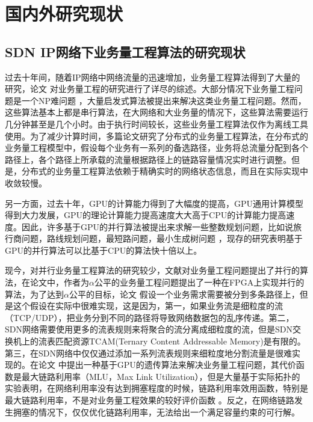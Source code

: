 \documentclass[master]{thesis-uestc}
\begin{document}
\section{国内外研究现状}
\subsection{SDN IP网络下业务量工程算法的研究现状}
过去十年间，随着IP网络中网络流量的迅速增加，业务量工程算法得到了大量的研究，论文 对业务量工程的研究进行了详尽的综述。大部分情况下业务量工程问题是一个NP难问题 ，大量启发式算法被提出来解决这类业务量工程问题。然而，这些算法基本上都是串行算法，在大网络和大业务量的情况下，这些算法需要运行几分钟甚至是几个小时。由于执行时间较长，这些业务量工程算法仅作为离线工具使用。为了减少计算时间，多篇论文研究了分布式的业务量工程算法，在分布式的业务量工程模型中，假设每个业务有一系列的备选路径，业务将总流量分配到各个路径上，各个路径上所承载的流量根据路径上的链路容量情况实时进行调整。但是，分布式的业务量工程算法依赖于精确实时的网络状态信息，而且在实际实现中收敛较慢。

另一方面，过去十年，GPU的计算能力得到了大幅度的提高，GPU通用计算模型得到大力发展，GPU的理论计算能力提高速度大大高于CPU的计算能力提高速度。因此，许多基于GPU的并行算法被提出来求解一些整数规划问题，比如说旅行商问题，路线规划问题，最短路问题，最小生成树问题 ，现存的研究表明基于GPU的并行算法可以比基于CPU的算法快十倍以上。

现今，对并行业务量工程算法的研究较少，文献对业务量工程问题提出了并行的算法，在论文中，作者为$\alpha$公平的业务量工程问题提出了一种在FPGA上实现并行的算法，为了达到$\alpha$公平的目标，论文 假设一个业务需求需要被分到多条路径上，但是这个假设在实际中很难实现，这是因为，第一，如果业务流是细粒度的流（TCP/UDP），把业务分到不同的路径将导致网络数据包的乱序传递。第二，SDN网络需要使用更多的流表规则来将聚合的流分离成细粒度的流，但是SDN交换机上的流表匹配资源TCAM(Ternary Content Addressable Memory)是有限的。第三，在SDN网络中仅仅通过添加一系列流表规则来细粒度地分割流量是很难实现的。在论文 中提出一种基于GPU的遗传算法来解决业务量工程问题，其代价函数是最大链路利用率（MLU，Max Link Utilization），但是大量基于实际拓扑的实验表明，在网络利用率没有达到拥塞程度的时候，链路利用率效用函数，特别是最大链路利用率，不是对业务量工程效果的较好评价函数 。反之，在网络链路发生拥塞的情况下，仅仅优化链路利用率，无法给出一个满足容量约束的可行解。
\end{document}
